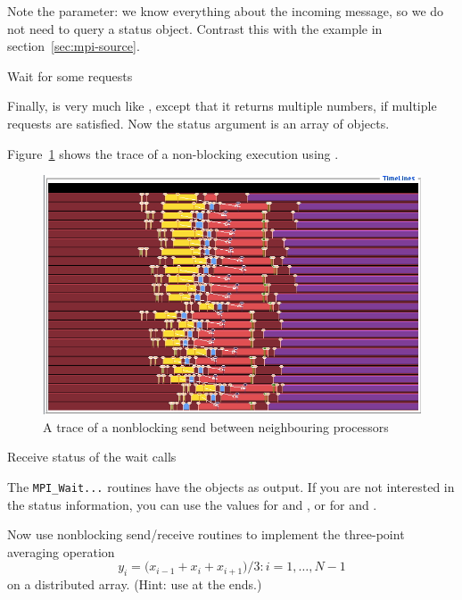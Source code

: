 Note the  parameter: we know everything
about the incoming message, so we do not need to query a status object.
Contrast this with the example in section~\ref{sec:mpi-source}.

 {Wait for some requests}

Finally,  is very much like ,
except that it returns multiple numbers, if multiple requests are
satisfied. Now the status argument is an array of 
objects.

Figure~\ref{fig:jump-nonblock} shows the trace of a non-blocking execution
using .
\begin{figure}[ht]
\includegraphics[scale=.4]{graphics/linear-nonblock}
\caption{A trace of a nonblocking send between neighbouring processors}
\label{fig:jump-nonblock}
\end{figure}

 {Receive status of the wait calls}

The \lstinline{MPI_Wait...} routines have the 
objects as output.
If you are not interested in
the status information, you can use the values
 for  and
,
or  for 
and .

\begin{exercise}
  \label{ex:3ptnonblock}
  Now use nonblocking send/receive routines to implement
  the three-point averaging operation
  \[ y_i=\bigl( x_{i-1}+x_i+x_{i+1} \bigr)/3\colon i=1,\ldots,N-1 \]
  on a distributed array. (Hint: use  at the ends.)
\end{exercise}

